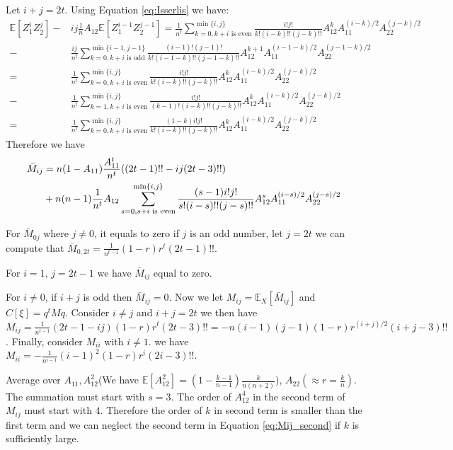 \documentclass{article}
\def\E{\mathbb{E}}
\begin{document}
Let $i+j=2t$. Using Equation \eqref{eq:Isserlis} we have:
\begin{align*}
\E[Z_1^i Z_2^j]  -  & ij \frac{1}{n}A_{12}\E[Z_1^{i-1}Z_2^{j-1}] =
\frac{1}{n^t} \sum_{k=0, k+i \textrm{ is even}}^{\min\{i,j\}}
\frac{i! j!}{k! (i-k)!!(j-k)!!}
A_{12}^k A_{11}^{(i-k)/2}A_{22}^{(j-k)/2} \\
- & \frac{ij}{n^t} \sum_{k=0, k+i \textrm{ is odd}}^{\min\{i-1,j-1\}}
\frac{(i-1)! (j-1)!}{k! (i-1-k)!!(j-1-k)!!}
A_{12}^{k+1} A_{11}^{(i-1-k)/2}A_{22}^{(j-1-k)/2} \\
= &\frac{1}{n^t} \sum_{k=0, k+i \textrm{ is even}}^{\min\{i,j\}}
\frac{i! j!}{k! (i-k)!!(j-k)!!}
A_{12}^k A_{11}^{(i-k)/2}A_{22}^{(j-k)/2} \\
- & \frac{1}{n^t} \sum_{k=1, k+i \textrm{ is even}}^{\min\{i,j\}}
\frac{i! j!}{(k-1)! (i-k)!!(j-k)!!}
A_{12}^{k} A_{11}^{(i-k)/2}A_{22}^{(j-k)/2} \\
= &\frac{1}{n^t} \sum_{k=0, k+i \textrm{ is even}}^{\min\{i,j\}}
\frac{(1-k)i! j!}{k! (i-k)!!(j-k)!!}A_{12}^k A_{11}^{(i-k)/2}A_{22}^{(j-k)/2} 
\end{align*}
Therefore we have
\begin{align}
\bar{M}_{ij} &= n(1-A_{11})\frac{A^t_{11}}{n^t}  ((2t-1)!!- ij (2t-3)!!)  \notag\\
&+n(n-1)\frac{1}{n^t}A_{12} \sum_{s=0, s+i \textrm{ is even}}^{\min\{i,j\}}
\frac{(s-1)i!j!}{s!(i-s)!!(j-s)!!}
A_{12}^s A_{11}^{(i - s) /2}A_{22}^{(j - s)/2} \label{eq:Mij_second}
\end{align}

For $\bar{M}_{0j}$ where $j \neq 0$,
it equals to zero if $j$ is an odd number,
let $j=2t$ we can compute that
$\bar{M}_{0,2t}=\frac{1}{n^{t-1}} (1-r)r^t (2t-1)!! $.

For $i = 1$, $ j = 2 t - 1$ we have
$\bar{M}_{ij}$ equal to zero.

For $i \neq 0$, if $i+j$ is odd then $\bar{M}_{ij} = 0$. Now we let $M_{ij} = \E_X[\bar{M}_{ij}]$ and 
$C[\xi]=q^t M q$.
Consider $i \neq j$ and $i+j = 2t$ we then have
$M_{ij} = \frac{1}{n^{t-1}} (2t-1-ij) (1-r)r^t (2t-3)!! =
-n(i-1)(j-1) (1-r)r^{(i+j)/ 2 } (i+j-3)!!$.
Finally, consider $M_{ii}$ with $i \neq 1$. we have $M_{ii} =
-\frac{1}{n^{i-1}} (i-1)^2 (1-r)r^i (2i-3)!!$.

Average over $A_{11}, A^2_{12}$(We have $\E[A^2_{12}]= (1-\frac{k-1}{n-1})\frac{k}{n(n+2)}$),
$A_{22}(\approx r = \frac{k}{n})$.
The summation must start with $s=3$.
The order of $A_{12}^4$ in
the second term of $M_{ij}$ must start with $4$.
Therefore the order of $k$ in second term is smaller than
the first term and we can neglect the second term in Equation \eqref{eq:Mij_second}
if $k$ is sufficiently large.
\end{document}
